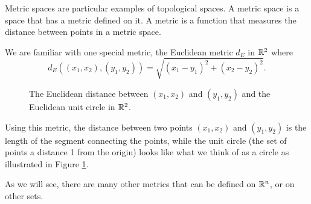  \label{sec:metric_spaces}


\vspace*{-17 pt}

\vspace*{13 pt}


Metric spaces are particular examples of topological spaces. A metric space is a space that has a metric defined on it. A metric is a function that measures the distance between points in a metric space. 

We are familiar with one special metric, the Euclidean metric $d_E$ in $\mathbb{R}^2$ where 
\[d_E((x_1,x_2),(y_1,y_2)) = \sqrt{(x_1-y_1)^2 + (x_2-y_2)^2}.\]
\begin{figure}[ht]
\begin{center}
\end{center}
\caption{The Euclidean distance between $(x_1,x_2)$ and $(y_1,y_2)$ and the Euclidean unit circle in $\mathbb{R}^2$.}
\label{F:Euclidean_metric}
\end{figure}
Using this metric, the distance between two points $(x_1,x_2)$ and $(y_1,y_2)$ is the length of the segment connecting the points, while the unit circle (the set of points a distance 1 from the origin) looks like what we think of as a circle as illustrated in Figure \ref{F:Euclidean_metric}.

As we will see, there are many other metrics that can be defined on $\mathbb{R}^n$, or on other sets. 

